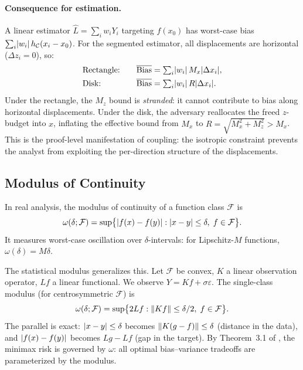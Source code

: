 \paragraph{Consequence for estimation.}
A linear estimator $\hat{L} = \sum_i w_i Y_i$ targeting $f(x_0)$ has worst-case bias $\sum_i \lvert w_i\rvert\, h_{\mathcal{C}}(x_i - x_0)$.
For the segmented estimator, all displacements are horizontal ($\Delta z_i = 0$), so:
\begin{alignat*}{2}
	&\text{Rectangle:} &\quad \overline{\mathrm{Bias}} &= \textstyle\sum_i \lvert w_i\rvert\, M_x\lvert\Delta x_i\rvert, \\
	&\text{Disk:} &\quad \overline{\mathrm{Bias}} &= \textstyle\sum_i \lvert w_i\rvert\, R\lvert\Delta x_i\rvert.
\end{alignat*}
Under the rectangle, the $M_z$ bound is \emph{stranded}: it cannot contribute to bias along horizontal displacements.
Under the disk, the adversary reallocates the freed $z$-budget into $x$, inflating the effective bound from $M_x$ to $R = \sqrt{M_x^2 + M_z^2} > M_x$.
This is the proof-level manifestation of coupling: the isotropic constraint prevents the analyst from exploiting the per-direction structure of the displacements.


\subsection{Modulus of Continuity}\label{sec:technical:modulus}

In real analysis, the modulus of continuity of a function class $\mathcal{F}$ is
\begin{equation*}
	\omega(\delta; \mathcal{F}) = \sup\bigl\{ \lvert f(x) - f(y)\rvert : \lvert x - y\rvert \leq \delta,\; f \in \mathcal{F} \bigr\}.
\end{equation*}
It measures worst-case oscillation over $\delta$-intervals: for Lipschitz-$M$ functions, $\omega(\delta) = M\delta$.

The statistical modulus \parencite{donoho_statistical_1994,armstrong_optimal_2018} generalizes this.
Let $\mathcal{F}$ be convex, $K$ a linear observation operator, $Lf$ a linear functional.
We observe $Y = Kf + \sigma\varepsilon$.
The single-class modulus (for centrosymmetric $\mathcal{F}$) is
\begin{equation}\label{eq:modulus_single}
	\omega(\delta; \mathcal{F}) = \sup\bigl\{ 2Lf : \lVert Kf\rVert \leq \delta/2,\; f \in \mathcal{F} \bigr\}.
\end{equation}
The parallel is exact: $\lvert x - y\rvert \leq \delta$ becomes $\lVert K(g-f)\rVert \leq \delta$ (distance in the data), and $\lvert f(x) - f(y)\rvert$ becomes $Lg - Lf$ (gap in the target).
By Theorem~3.1 of \textcite{armstrong_optimal_2018}, the minimax risk is governed by $\omega$: all optimal bias--variance tradeoffs are parameterized by the modulus.

